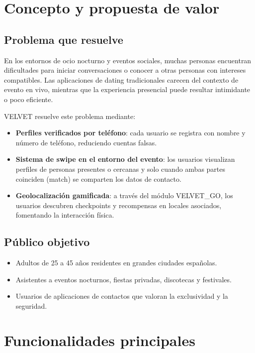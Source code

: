 \documentclass[11pt,a4paper]{article}
\begin{document}
\section{Concepto y propuesta de valor}

\subsection{Problema que resuelve}

En los entornos de ocio nocturno y eventos sociales, muchas personas encuentran dificultades para iniciar conversaciones o conocer a otras personas con intereses compatibles. Las aplicaciones de dating tradicionales carecen del contexto de evento en vivo, mientras que la experiencia presencial puede resultar intimidante o poco eficiente.

VELVET resuelve este problema mediante:

\begin{itemize}[leftmargin=*]
  \item \textbf{Perfiles verificados por teléfono}: cada usuario se registra con nombre y número de teléfono, reduciendo cuentas falsas.
  \item \textbf{Sistema de swipe en el entorno del evento}: los usuarios visualizan perfiles de personas presentes o cercanas y solo cuando ambas partes coinciden (match) se comparten los datos de contacto.
  \item \textbf{Geolocalización gamificada}: a través del módulo VELVET\_GO, los usuarios descubren checkpoints y recompensas en locales asociados, fomentando la interacción física.
\end{itemize}

\subsection{Público objetivo}

\begin{itemize}[leftmargin=*]
  \item Adultos de 25 a 45 años residentes en grandes ciudades españolas.
  \item Asistentes a eventos nocturnos, fiestas privadas, discotecas y festivales.
  \item Usuarios de aplicaciones de contactos que valoran la exclusividad y la seguridad.
\end{itemize}

\section{Funcionalidades principales}
\end{document}

